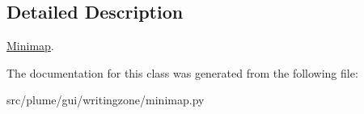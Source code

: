 \subsection{Detailed Description}
\hyperlink{classplume-creator_1_1src_1_1plume_1_1gui_1_1writingzone_1_1minimap_1_1_minimap}{Minimap}. 

The documentation for this class was generated from the following file\+:\begin{DoxyCompactItemize}
\item 
src/plume/gui/writingzone/minimap.\+py\end{DoxyCompactItemize}
